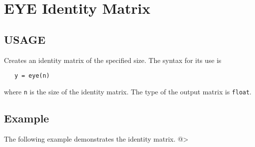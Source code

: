\section{EYE Identity Matrix}

\subsection{USAGE}

Creates an identity matrix of the specified size.  The syntax for
its use is
\begin{verbatim}
   y = eye(n)
\end{verbatim}
where \verb|n| is the size of the identity matrix.  The type of the 
output matrix is \verb|float|.
\subsection{Example}

The following example demonstrates the identity matrix.
@>
